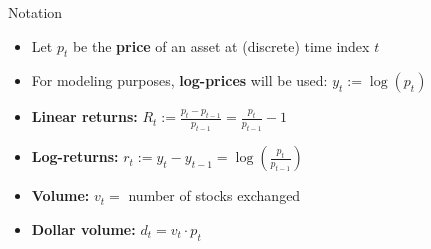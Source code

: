 \documentclass[usenames,dvipsnames]{beamer} %
\begin{document}
\begin{frame}{Notation}
	\begin{itemize}
		\item Let $p_t$ be the \textbf{price} of an asset at (discrete) time 
		index $t$
		
		\vspace{.25cm}
		\item For modeling purposes, \textbf{log-prices} will be 	used:
		$y_t := \log (p_t)$ 
		
		\vspace{.8cm}
		\item \textbf{Linear returns:} $R_t := \frac{p_t - p_{t-1}}{p_{t-1}} 
		= \frac{p_t}{p_{t-1}} - 1$
		
		\vspace{.25cm}
		\item \textbf{Log-returns:} $r_t := y_t - y_{t-1} = \log \left( 
		\frac{p_t}{p_{t-1}} \right)$

		\vspace{.8cm}
		\item \textbf{Volume:} $v_t =$ number of stocks exchanged
		
		\vspace{.25cm}
		\item \textbf{Dollar volume:} $d_t = v_t \cdot p_t$
	\end{itemize}
	
\end{frame}
\end{document}
